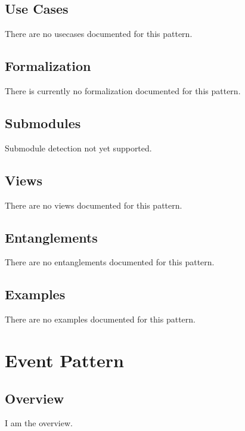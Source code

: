 \subsection{Use Cases}
\label{ssec:use-cases}
There are no usecases documented for this pattern.
\subsection{Formalization}
\label{ssec:formalization}
There is currently no formalization documented for this pattern.

\subsection{Submodules}
\label{ssec:submodules}
Submodule detection not yet supported.

\subsection{Views}
\label{ssec:views}
There are no views documented for this pattern.


\subsection{Entanglements}
\label{ssec:entanglements}
There are no entanglements documented for this pattern.

\subsection{Examples}
\label{ssec:examples}
There are no examples documented for this pattern.


\section{Event Pattern}
\label{sec:event-pattern}
\subsection{Overview}
\label{ssec:overview}
I am the overview.

